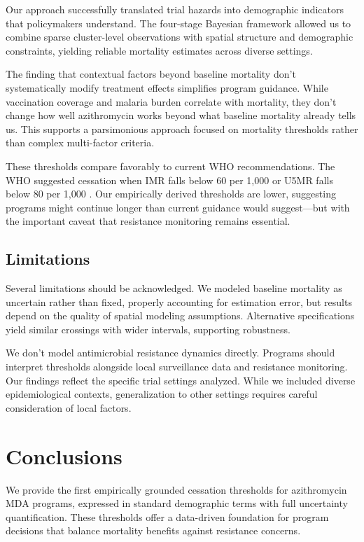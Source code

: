 \documentclass[11pt]{article}\usepackage[]{graphicx}\usepackage[]{xcolor}
\begin{document}
Our approach successfully translated trial hazards into demographic indicators that policymakers understand. The four-stage Bayesian framework allowed us to combine sparse cluster-level observations with spatial structure and demographic constraints, yielding reliable mortality estimates across diverse settings.

The finding that contextual factors beyond baseline mortality don't systematically modify treatment effects simplifies program guidance. While vaccination coverage and malaria burden correlate with mortality, they don't change how well azithromycin works beyond what baseline mortality already tells us. This supports a parsimonious approach focused on mortality thresholds rather than complex multi-factor criteria.

These thresholds compare favorably to current WHO recommendations. The WHO suggested cessation when IMR falls below 60 per 1,000 or U5MR falls below 80 per 1,000 \citep{who2020guidelines}. Our empirically derived thresholds are lower, suggesting programs might continue longer than current guidance would suggest---but with the important caveat that resistance monitoring remains essential.

\subsection{Limitations}

Several limitations should be acknowledged. We modeled baseline mortality as uncertain rather than fixed, properly accounting for estimation error, but results depend on the quality of spatial modeling assumptions. Alternative specifications yield similar crossings with wider intervals, supporting robustness.

We don't model antimicrobial resistance dynamics directly. Programs should interpret thresholds alongside local surveillance data and resistance monitoring. Our findings reflect the specific trial settings analyzed. While we included diverse epidemiological contexts, generalization to other settings requires careful consideration of local factors.

\section{Conclusions}

We provide the first empirically grounded cessation thresholds for azithromycin MDA programs, expressed in standard demographic terms with full uncertainty quantification. These thresholds offer a data-driven foundation for program decisions that balance mortality benefits against resistance concerns.
\end{document}
